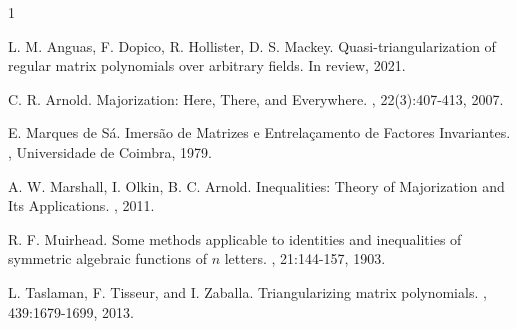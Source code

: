 \documentclass[a4paper]{amsart}
\begin{document}
\begin{thebibliography}{1}

L. M. Anguas, F. Dopico, R. Hollister, D. S. Mackey.
\newblock Quasi-triangularization of regular matrix polynomials over arbitrary fields.
\newblock In review, 2021.

C. R. Arnold.
\newblock Majorization: Here, There, and Everywhere.
, 22(3):407-413, 2007.

E. Marques de S\'a.
\newblock Imers\~ao de Matrizes e Entrela\c{c}amento de Factores Invariantes.
, Universidade de Coimbra, 1979.

A. W. Marshall, I. Olkin, B. C. Arnold.
\newblock Inequalities: Theory of Majorization and Its Applications.
, 2011.

R. F. Muirhead.
\newblock Some methods applicable to identities and inequalities of symmetric algebraic functions of $n$ letters.
, 21:144-157, 1903.

L. Taslaman, F. Tisseur, and I. Zaballa.
\newblock Triangularizing matrix polynomials.
, 439:1679-1699, 2013.



\end{thebibliography}
\end{document}
